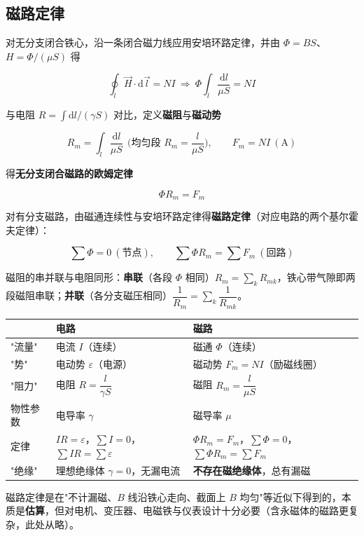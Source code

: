 \subsection{磁路定律}
对无分支闭合铁心，沿一条闭合磁力线应用安培环路定律，并由 $\Phi=BS$、$H=\Phi/(\mu S)$ 得
\begin{formulaBox}
\[
\oint_l\vec{H}\cdot\mathrm{d}\vec{l}=NI
\ \Longrightarrow\
\Phi\int_l\frac{\mathrm{d}l}{\mu S}=NI
\]
\end{formulaBox}
与电阻 $R=\int\mathrm{d}l/(\gamma S)$ 对比，定义\textbf{磁阻}与\textbf{磁动势}
\begin{formulaBox}
\[
R_m=\int_l\frac{\mathrm{d}l}{\mu S}
\ \ \Big(\text{均匀段 }R_m=\frac{l}{\mu S}\Big),
\qquad
F_m=NI\ (\mathrm{A})
\]
\end{formulaBox}
得\textbf{无分支闭合磁路的欧姆定律}
\begin{formulaBox}
\[
\Phi R_m=F_m
\]
\end{formulaBox}
对有分支磁路，由磁通连续性与安培环路定律得\textbf{磁路定律}（对应电路的两个基尔霍夫定律）：
\begin{formulaBox}
\[
\sum\Phi=0\ (\text{节点}),
\qquad
\sum\Phi R_m=\sum F_m\ (\text{回路})
\]
\end{formulaBox}
磁阻的串并联与电阻同形：\textbf{串联}（各段 $\Phi$ 相同）$R_m=\sum_k R_{mk}$，铁心带气隙即两段磁阻串联；\textbf{并联}（各分支磁压相同）$\dfrac{1}{R_m}=\sum_k\dfrac{1}{R_{mk}}$。
\begin{center}
\small
\begin{tabularx}{\linewidth}{@{}l X X@{}}
\toprule
 & \textbf{电路} & \textbf{磁路} \\
\midrule
"流量" & 电流 $I$（连续） & 磁通 $\Phi$（连续） \\
"势" & 电动势 $\varepsilon$（电源） & 磁动势 $F_m=NI$（励磁线圈） \\
"阻力" & 电阻 $R=\dfrac{l}{\gamma S}$ & 磁阻 $R_m=\dfrac{l}{\mu S}$ \\
物性参数 & 电导率 $\gamma$ & 磁导率 $\mu$ \\
定律 & $IR=\varepsilon$，$\sum I=0$，$\sum IR=\sum\varepsilon$ & $\Phi R_m=F_m$，$\sum\Phi=0$，$\sum\Phi R_m=\sum F_m$ \\
"绝缘" & 理想绝缘体 $\gamma=0$，无漏电流 & \textbf{不存在磁绝缘体}，总有漏磁 \\
\bottomrule
\end{tabularx}
\end{center}
磁路定律是在"不计漏磁、$B$ 线沿铁心走向、截面上 $B$ 均匀"等近似下得到的，本质是\textbf{估算}，但对电机、变压器、电磁铁与仪表设计十分必要（含永磁体的磁路更复杂，此处从略）。

